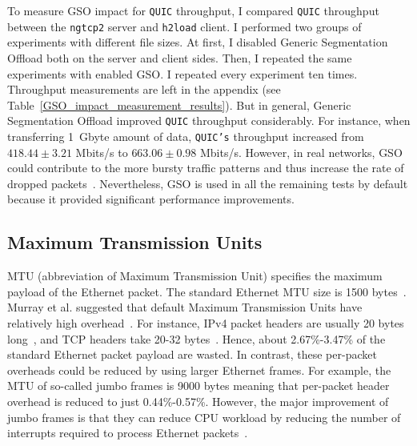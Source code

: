 \documentclass[12pt,a4paper,twoside,openright]{report}
\begin{document}
    To measure GSO impact for \texttt{QUIC} throughput, I compared \texttt{QUIC} throughput between the \texttt{ngtcp2} server and \texttt{h2load} client.
    I performed two groups of experiments with different file sizes.
    At first, I disabled Generic Segmentation Offload both on the server and client sides.
    Then, I repeated the same experiments with enabled GSO.
    I repeated every experiment ten times.
    Throughput measurements are left in the appendix (see Table~\ref{GSO_impact_measurement_results}).
    But in general, Generic Segmentation Offload improved \texttt{QUIC} throughput considerably.
    For instance, when transferring 1~Gbyte amount of data, \texttt{QUIC's} throughput increased from $418.44 \pm 3.21$ Mbits/s to $663.06 \pm 0.98$ Mbits/s.
    However, in real networks, GSO could contribute to the more bursty traffic patterns and thus increase the rate of dropped packets~\cite{accelerating-udp-packet-transmission-for-quic}.
    Nevertheless, GSO is used in all the remaining tests by default because it provided significant performance improvements.


\subsection{Maximum Transmission Units}
  MTU (abbreviation of Maximum Transmission Unit) specifies the maximum payload of the Ethernet packet.
  The standard Ethernet MTU size is 1500 bytes~\cite{The_Ethernet_Frame_Payload_Size_and_Its_Effect_on_IPv4_and_IPv6_Traffic}. 
  Murray et al. suggested that default Maximum Transmission Units have relatively high overhead~\cite{Large_MTUs_and_Internet_Performance}.
  For instance, IPv4 packet headers are usually 20 bytes long~\cite{FallKevinR2012TiV1}, and TCP headers take 20-32 bytes~\cite{Large_MTUs_and_Internet_Performance}.
  Hence, about 2.67\%-3.47\% of the standard Ethernet packet payload are wasted.
  In contrast, these per-packet overheads could be reduced by using larger Ethernet frames.
  For example, the MTU of so-called jumbo frames is 9000 bytes meaning that per-packet header overhead is reduced to just 0.44\%-0.57\%.
  However, the major improvement of jumbo frames is that they can reduce CPU workload by reducing the number of interrupts required to process Ethernet packets~\cite{Extended_rame_Sizes_for_Next_Generation_Ethernets}.
  
\end{document}
